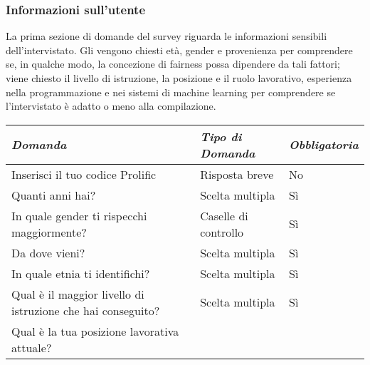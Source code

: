 \subsubsection{Informazioni sull'utente}

La prima sezione di domande del survey riguarda le informazioni sensibili dell'intervistato. Gli vengono chiesti età, gender e provenienza per comprendere se, in qualche modo, la concezione di fairness possa dipendere da tali fattori; viene chiesto il livello di istruzione, la posizione e il ruolo lavorativo, esperienza nella programmazione e nei sistemi di machine learning per comprendere se l'intervistato è adatto o meno alla compilazione.

\begin{longtable}{| p{} | p{} | p{} |} 
\hline\textbf{\textit{Domanda}} & \textbf{\textit{Tipo di Domanda}} & \textbf{\textit{Obbligatoria}}\\
\hline
\endhead 

\hline 
Inserisci il tuo codice Prolific

& Risposta breve

& No 

\\ \hline
\rowcolor{Gray!30}
Quanti anni hai?        

&  Scelta multipla

& Sì

\\ \hline

In quale gender ti rispecchi maggiormente?

& Caselle di controllo

& Sì

\\ \hline
\rowcolor{Gray!30}
Da dove vieni?        

&  Scelta multipla

& Sì

\\ 
\hline 
In quale etnia ti identifichi?

& Scelta multipla

& Sì

\\ \hline

\rowcolor{Gray!30}
Qual è il maggior livello di istruzione che hai conseguito?

& Scelta multipla

& Sì

\\ \hline
Qual è la tua posizione lavorativa attuale?        


\end{longtable}
